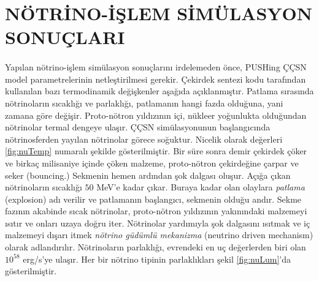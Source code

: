 \section{NÖTRİNO-İŞLEM SİMÜLASYON SONUÇLARI}\label{sec:NotrinoIslemSimSonuc}
\paragraph{}
Yapılan nötrino-işlem simülasyon sonuçlarını irdelemeden önce, PUSHing ÇÇSN model parametrelerinin netleştirilmesi gerekir. Çekirdek sentezi kodu tarafından kullanılan bazı termodinamik değişkenler aşağıda açıklanmıştır. Patlama sırasında nötrinoların sıcaklığı ve parlaklığı, patlamanın hangi fazda olduğuna, yani zamana göre değişir. Proto-nötron yıldızının içi, nükleer yoğunlukta olduğundan nötrinolar termal dengeye ulaşır. ÇÇSN simülasyonunun başlangıcında nötrinosferden yayılan nötrinolar görece soğuktur. Nicelik olarak değerleri \ref{fig:nuTemp} numaralı şekilde gösterilmiştir. Bir süre sonra demir çekirdek çöker ve birkaç milisaniye içinde çöken malzeme, proto-nötron çekirdeğine çarpar ve seker (bouncing.) Sekmenin hemen ardından şok dalgası oluşur. Açığa çıkan nötrinoların sıcaklığı $50$ MeV'e kadar çıkar. Buraya kadar olan olaylara \emph{patlama} (explosion) adı verilir ve patlamanın başlangıcı, sekmenin olduğu andır. Sekme fazının akabinde sıcak nötrinolar, proto-nötron yıldızının yakınındaki malzemeyi ısıtır ve onları uzaya doğru iter. Nötrinolar yardımıyla şok dalgasını ısıtmak ve iç malzemeyi dışarı itmek \emph{nötrino güdümlü mekanizma} (neutrino driven mechanism) olarak adlandırılır. Nötrinoların parlaklığı, evrendeki en uç değerlerden biri olan $10^{58} $ erg/s'ye ulaşır. Her bir nötrino tipinin parlaklıkları şekil \ref{fig:nuLum}'da gösterilmiştir.

